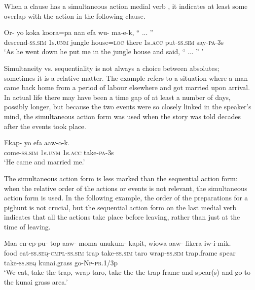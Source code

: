 When a clause has a simultaneous action medial verb , it indicates at least some overlap with the action in the following clause. 

\ea%
\label{ex:8:x1432}
\gll Or-  yo  koka  koora=pa  nan  efa wu-  ma-e-k,  `` ... '' \\
descend-\textsc{ss}.\textsc{sim} 1s.\textsc{unm} jungle house=\textsc{loc} there 1s.\textsc{acc} put-\textsc{ss}.\textsc{sim} say-\textsc{pa}-3s\\
\glt`As he went down he put me in the jungle house and said, `` ... '' '
\z


Simultaneity vs. sequentiality is not always a choice between absolutes; sometimes it is a relative matter. The example  refers to a situation where a man came back home from a period of labour elsewhere and got married upon arrival. In actual life there may have been a time gap of at least a number of days, possibly longer, but because the two events were so closely linked in the speaker's mind, the simultaneous action form was used when the story was told decades after the events took place.

\ea%
\label{ex:8:x1433}
\gll Ekap-  yo  efa  aaw-o-k. \\
come-\textsc{ss}.\textsc{sim} 1s.\textsc{unm} 1s.\textsc{acc} take-\textsc{pa}-3s\\
\glt`He came and married me.'
\z


The simultaneous action form is less marked than the sequential action form: when the relative order of the actions or events is not relevant, the simultaneous action form is used. In the following example, the order of the preparations for a pighunt is not crucial, but the sequential action form on the last medial verb indicates that all the actions take place before leaving, rather than just at the time of leaving.  

\ea%
\label{ex:8:x1437}
\gll Maa  en-ep-pu-  top  aaw-  moma unukum-  kapit,  wiowa  aaw-  fikera iw-i-mik.\\
food  eat-\textsc{ss}.\textsc{seq}-\textsc{cmpl}-\textsc{ss}.\textsc{sim} trap take-\textsc{ss}.\textsc{sim} taro wrap-\textsc{ss}.\textsc{sim} trap.frame spear take-\textsc{ss}.\textsc{seq} kunai.grass go-\textsc{Np}-\textsc{pr}.1/3p\\
\glt`We eat, take the trap, wrap taro, take the the trap frame and spear(s) and go to the kunai grass area.'
\z


